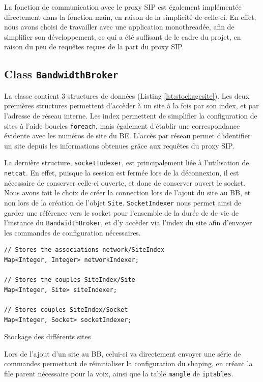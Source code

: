 \documentclass[a4paper,11pt]{article}
\let\Oldsubsection\subsection
\renewcommand{\subsection}{\FloatBarrier\Oldsubsection}
\begin{document}
La fonction de communication avec le proxy SIP est également implémentée directement dans la fonction main, en raison de la simplicité de celle-ci. En effet, nous avons choisi de travailler avec une application monothreadée,  afin de simplifier son développement, ce qui a été suffisant de le cadre du projet, en raison du peu de requêtes reçues de la part du proxy SIP.

\subsection{Class \texttt{BandwidthBroker}}

La classe contient 3 structures de données (Listing \ref{lst:stockagesite}). Les deux premières structures permettent d'accèder à un site à la fois par son index, et par l'adresse de réseau interne. Les index permettent de simplifier la configuration de sites  à l'aide boucles \texttt{foreach}, mais également d'établir une correspondance évidente avec les numéros de site du BE.
L'accès par réseau permet d'identifier un site depuis les informations obtenues grâce aux requêtes du proxy SIP.

La dernière structure, \texttt{socketIndexer}, est principalement liée à l'utilisation de \texttt{netcat}. En effet, puisque la session est fermée lors de la déconnexion, il est nécessaire de conserver celle-ci ouverte, et donc de conserver ouvert le socket. 
Nous avons fait le choix de créer la connection lors de l'ajout du site au BB, et non lors de la création de l'objet \texttt{Site}. \texttt{SocketIndexer} nous permet ainsi de garder une référence vers le socket pour l'ensemble de la durée de de vie de l'instance du \texttt{BandwidthBroker}, et d'y accèder via l'index du site afin d'envoyer les commandes de configuration nécessaires.


\begin{listing}[htp]
    \begin{verbatim}
// Stores the associations network/SiteIndex
Map<Integer, Integer> networkIndexer;

// Stores the couples SiteIndex/Site
Map<Integer, Site> siteIndexer;

// Stores couples SiteIndex/Socket
Map<Integer, Socket> socketIndexer;
      \end{verbatim}
    \caption{Stockage des différents sites}
    \label{lst:stockagesite}
\end{listing}

Lors de l'ajout d'un site au BB, celui-ci va directement envoyer une série de commandes permettant de réinitialiser la configuration du shaping, en créant la file parent nécessaire pour la voix, ainsi que la table \texttt{mangle} de \texttt{iptables}.
\end{document}
